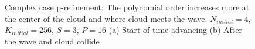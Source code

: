 \begin{figure}[H]
    \centering
    \hfill
    \caption{Complex case p-refinement: The polynomial order increases more at the center of the
        cloud and where cloud meets the wave. \(N_{initial} = 4\), \(K_{initial} = 256\), \(S = 3\),
        \(P = 16\) (a) Start of time advancing (b) After the wave and cloud
        collide}\label{fig:cloud_N}
\end{figure}

